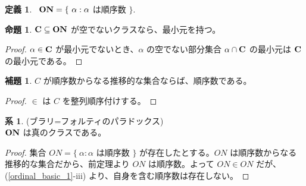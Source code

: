 \documentclass{jsarticle}
\theoremstyle{definition}
\newtheorem*{definition*}{定義}
\newtheorem{proposition}[theorem]{命題}
\newtheorem{lemma}[theorem]{補題}
\newtheorem{corollary}[theorem]{系}
\begin{document}
    \begin{definition*} \
        $\bf{ON} = \{\ \alpha : \alpha$ は順序数 $\}.$
    \end{definition*}
    \begin{proposition} $\bf{C} \subseteq \bf{ON}$ が空でないクラスなら、最小元を持つ。
    \end{proposition}
    \begin{proof}
        $\alpha \in \bf{C}$ が最小元でないとき、$\alpha$ の空でない部分集合 $\alpha \cap \bf{C}$ の最小元は $\bf{C}$ の最小元である。
    \end{proof}
    \begin{lemma} \label{ordinal_basic_2} $C$ が順序数からなる推移的な集合ならば、順序数である。
    \end{lemma}
    \begin{proof}
        $\in$ は $C$ を整列順序付けする。
    \end{proof}
    \begin{corollary} \label{Burali_Forti_Paradox} (ブラリ=フォルティのパラドックス) \\
    $\bf{ON}$ は真のクラスである。
    \end{corollary}
    \begin{proof}
        集合 $ON = \{\ \alpha : \alpha$ は順序数 $\}$ が存在したとする。$ON$ は順序数からなる推移的な集合だから、前定理より $ON$ は順序数。よって $ON \in ON$ だが、(\ref{ordinal_basic_1}-iii) より、自身を含む順序数は存在しない。
    \end{proof}
    \vspace{1ex}
    
\end{document}
